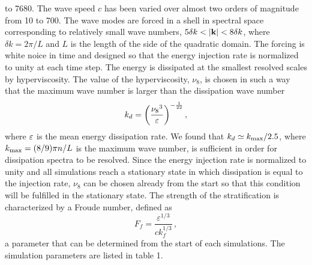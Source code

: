 to 7680.
%
The wave speed $c$ has been varied over almost two orders of magnitude from 10
to 700. The wave modes are forced in a shell in spectral space corresponding to
relatively small wave numbers, $ 5 \delta k < |\textbf{k}| < 8 \delta k$, where $
\delta k = 2 \pi /L $ and $ L $ is the length of the side of the quadratic
domain. The forcing is white noice in time and designed so that the energy
injection rate is normalized to unity at each time step. The energy is
dissipated at the smallest resolved scales by hyperviscosity. The value of the
hyperviscosity, $\nu_8$, is chosen in such a way that the maximum wave number
is larger than the dissipation wave number
\begin{equation}
k_{d} = \left( \frac{{\nu_8}^3}{\varepsilon} \right)^{-\frac{1}{22}},
\end{equation}
where $ \varepsilon $ is the mean energy dissipation rate. We found that $ k_{d}
\simeq \kmax/ 2.5$, where $\kmax = (8/9)\pi n/L $ is the maximum wave number,
is sufficient in order for dissipation spectra to be resolved. Since the energy
injection rate is normalized to unity and all simulations reach a stationary
state in which dissipation is equal to the injection rate, $ \nu_8 $ can be
chosen already from the start so that this condition will be fulfilled in the
stationary state. The strength of the stratification is characterized by a
Froude number, defined as
\begin{equation} \label{Fr}
F_f = \frac{\varepsilon^{1/3}}{c k_f^{1/3}} \, ,
\end{equation}
a parameter that can be determined from the start of each simulations.
The  simulation parameters are listed in table 1.


